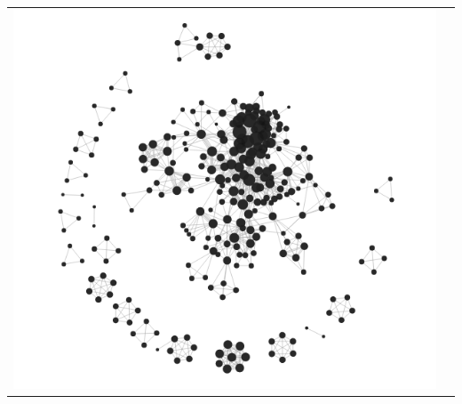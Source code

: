 \begin{center}
\begin{tabular}{cc}
\label{edgeTypes}
\includegraphics[trim={0 0 0 0}, width=140mm]{./Figures/TurinLocalCentralityFull.png}
\end{tabular}
\end{center}

